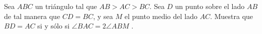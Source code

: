 Sea $ABC$ un triángulo tal que $AB > AC > BC$. Sea $D$ un punto sobre el lado $AB$ de tal
manera que $CD = BC$, y sea $M$ el punto medio del lado $AC$. Muestra que $BD = AC$ si
y sólo si $\angle BAC = 2\angle ABM$ .